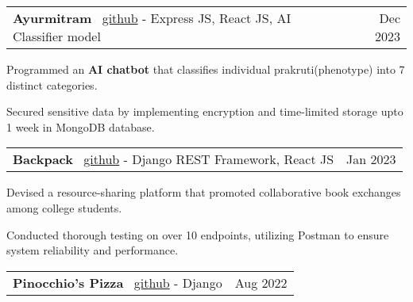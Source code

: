 \documentclass[a4paper,20pt]{article}
\makeatletter
\newcommand{\resumeSmallSubheading}[2]{
  \vspace{-1pt}\item
    \begin{tabular*}{0.97\textwidth}{l@{\extracolsep{\fill}}r}
      #1 & #2 \\
    \end{tabular*}\vspace{-5pt}
}
\makeatother
\begin{document}
    \resumeSmallSubheading{\textbf{Ayurmitram} \textbar ~\href{https://github.com/ayurmitram/}{github} - Express JS, React JS, AI Classifier model}{Dec 2023} %
            
    \begin{description}[font=$\bullet$]
        \item {Programmed an \textbf{AI chatbot} that classifies individual prakruti(phenotype) into 7 distinct categories.}
    \vspace{-2pt}
        \item {Secured sensitive data by implementing encryption and  time-limited storage upto 1 week in MongoDB database.}
    \end{description}

    \vspace{-2pt}


    \resumeSmallSubheading{\textbf{Backpack} \textbar ~\href{https://github.com/satyamrs00/backpack/}{github} - Django REST Framework, React JS}{Jan 2023} %
        
    \begin{description}[font=$\bullet$]
        \item {Devised a resource-sharing platform that promoted collaborative book exchanges among college students.}
    \vspace{-2pt}
        \item {Conducted thorough testing on over 10 endpoints, utilizing Postman to ensure system reliability and performance.}
    \end{description}

    \vspace{-2pt}

    \resumeSmallSubheading{\textbf{Pinocchio's Pizza} \textbar ~\href{https://github.com/satyamrs00/pizza/}{github} - Django}{Aug 2022} %
    
\end{document}
